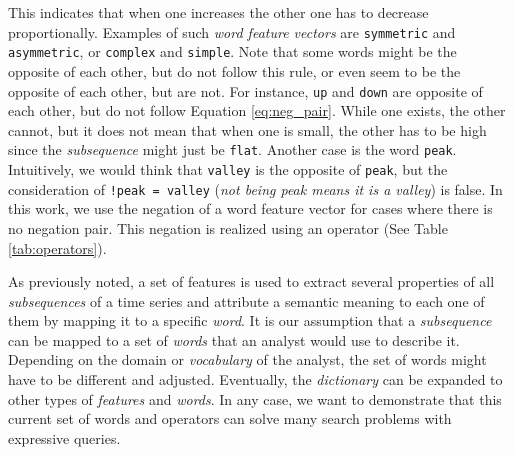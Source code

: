 This indicates that when one increases the other one has to decrease proportionally. Examples of such \textit{word feature vectors} are \texttt{symmetric} and \texttt{asymmetric}, or \texttt{complex} and \texttt{simple}. Note that some words might be the opposite of each other, but do not follow this rule, or even seem to be the opposite of each other, but are not. For instance, \texttt{up} and \texttt{down} are opposite of each other, but do not follow Equation \ref{eq:neg_pair}. While one exists, the other cannot, but it does not mean that when one is small, the other has to be high since the \textit{subsequence} might just be \texttt{flat}. Another case is the word \texttt{peak}. Intuitively, we would think that \texttt{valley} is the opposite of \texttt{peak}, but the consideration of \texttt{!peak = valley} (\textit{not being peak means it is a valley}) is false. In this work, we use the negation of a word feature vector for cases where there is no negation pair. This negation is realized using an operator (See Table \ref{tab:operators}).
\par
As previously noted, a set of features is used to extract several properties of all \textit{subsequences} of a time series and attribute a semantic meaning to each one of them by mapping it to a specific \textit{word}. It is our assumption that a \textit{subsequence} can be mapped to a set of \textit{words} that an analyst would use to describe it. Depending on the domain or \textit{vocabulary} of the analyst, the set of words might have to be different and adjusted. Eventually, the \textit{dictionary} can be expanded to other types of \textit{features} and \textit{words}. In any case, we want to demonstrate that this current set of words and operators can solve many search problems with expressive queries.

